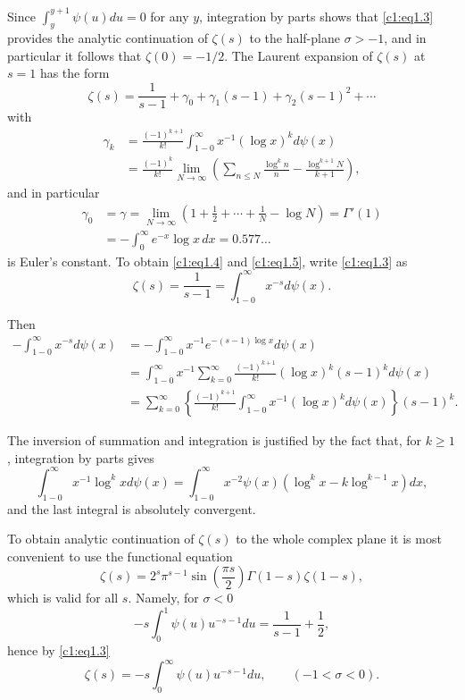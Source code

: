 Since $\displaystyle{\int^{y+1}_y} \psi (u) du=0$ for any $y$,
integration by parts shows that \eqref{c1:eq1.3}\pageoriginale
provides the analytic 
continuation of $\zeta(s)$ to the half-plane $\sigma > -1$, and in
particular it follows that $\zeta (0)=- 1/2$. The Laurent expansion of
$\zeta(s)$ at $s=1$ has the form
\begin{equation}
  \zeta (s) = \frac{1}{s-1} + \gamma_0 + \gamma_1 (s-1) + \gamma_2
  (s-1)^2 + \cdots \label{c1:eq1.4}
\end{equation}
with
\begin{align}
  \gamma_k &= \frac{(-1)^{k+1}}{k!} \int^\infty_{1-0} x^{-1}(\log x)^k d \psi
  (x)\nonumber\\ 
&= \frac{(-1)^k}{k!} \lim\limits_{N \to \infty} \left( \sum\limits_{n\leq N}\frac{\log
    ^k n}{n} - \frac{\log^{k+1}N}{k+1} \right),\label{c1:eq1.5}
\end{align}
and in particular
\begin{align*}
  \gamma_0 &= \gamma = \lim\limits_{N \to \infty} \left(1+ \frac{1}{2} +
  \cdots + \frac{1}{N} - \log N \right) = \Gamma' (1)\\ 
  &=- \int^\infty_{0}
  e^{-x} \log x \, dx = 0.577\ldots
\end{align*}
is Euler's constant. To obtain \eqref{c1:eq1.4} and \eqref{c1:eq1.5},
write \eqref{c1:eq1.3} as 
$$
\zeta (s) = \frac{1}{s-1} = \int^\infty_{1-0} x^{-s} d \psi (x).
$$

Then 
\begin{align*}
  - \int^\infty_{1-0} x^{-s} d \psi (x) & =- \int^\infty_{1-0} x^{-1}
  e^{- (s-1)\log x} d \psi (x)\\ 
  &  = \int^\infty_{1-0} x^{-1}
  \sum^\infty_{k=0} \frac{(-1)^{k+1}}{k!} (\log x)^k (s-1)^k d \psi
  (x)\\
  & = \sum^\infty_{k=0} \left\{ \frac{(-1)^{k+1}}{k!}
  \int^\infty_{1-0} x^{-1} (\log x)^k d \psi (x)\right\} (s-1)^k.
\end{align*}

The inversion of summation and integration is justified by the fact
that, for $k \geq 1$, integration by parts gives
$$
\int^\infty_{1-0} x^{-1} \log^k x d \psi (x) = \int^\infty_{1-0}
x^{-2} \psi (x) (\log^k x- k \log^{k-1}x) dx,
$$
and the last integral is absolutely convergent.

To obtain analytic continuation of $\zeta(s)$ to the whole complex
plane it is most convenient to use the functional equation
\begin{equation}
  \zeta (s) = 2^s \pi^{s-1} \sin \left( \frac{\pi s}{2}\right) \Gamma
  (1-s) \zeta (1-s),\label{c1:eq1.6}
\end{equation}
which is valid for all $s$. Namely, for $\sigma < 0$
$$
-s \int^1_0 \psi (u) u ^{-s -1} du = \frac{1}{s-1} + \frac{1}{2},
$$
hence by \eqref{c1:eq1.3}
\begin{equation}
  \zeta (s) = -s \int^\infty_{0} \psi (u) u^{-s -1}du, \qquad (-1 <
  \sigma < 0). \label{c1:eq1.7}
\end{equation}

